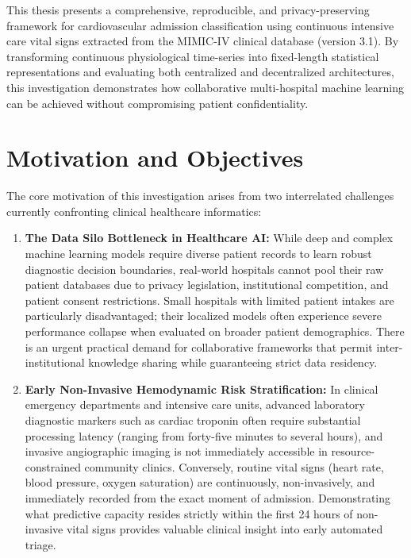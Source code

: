 \documentclass[12pt,a4paper,oneside]{report}
\begin{document}
This thesis presents a comprehensive, reproducible, and privacy-preserving framework for cardiovascular admission classification using continuous intensive care vital signs extracted from the MIMIC-IV clinical database (version 3.1). By transforming continuous physiological time-series into fixed-length statistical representations and evaluating both centralized and decentralized architectures, this investigation demonstrates how collaborative multi-hospital machine learning can be achieved without compromising patient confidentiality.

\section{Motivation and Objectives}
\label{sec:motivation_objectives}

The core motivation of this investigation arises from two interrelated challenges currently confronting clinical healthcare informatics:

\begin{enumerate}
    \item \textbf{The Data Silo Bottleneck in Healthcare AI:} While deep and complex machine learning models require diverse patient records to learn robust diagnostic decision boundaries, real-world hospitals cannot pool their raw patient databases due to privacy legislation, institutional competition, and patient consent restrictions. Small hospitals with limited patient intakes are particularly disadvantaged; their localized models often experience severe performance collapse when evaluated on broader patient demographics. There is an urgent practical demand for collaborative frameworks that permit inter-institutional knowledge sharing while guaranteeing strict data residency.
    
    \item \textbf{Early Non-Invasive Hemodynamic Risk Stratification:} In clinical emergency departments and intensive care units, advanced laboratory diagnostic markers such as cardiac troponin often require substantial processing latency (ranging from forty-five minutes to several hours), and invasive angiographic imaging is not immediately accessible in resource-constrained community clinics. Conversely, routine vital signs (heart rate, blood pressure, oxygen saturation) are continuously, non-invasively, and immediately recorded from the exact moment of admission. Demonstrating what predictive capacity resides strictly within the first 24 hours of non-invasive vital signs provides valuable clinical insight into early automated triage.
\end{enumerate}
\end{document}
